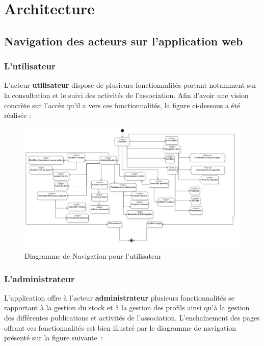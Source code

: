\documentclass[a4paper, titlepage]{report}
\let\oldparagraph\subsubsection
\renewcommand{\subsubsection}[1]{\oldparagraph{#1}\mbox{}}
\begin{document}
\section{Architecture}

\subsection{Navigation des acteurs sur l'application web}

\subsubsection{L'utilisateur}

L'acteur \textbf{utilisateur} dispose de plusieurs fonctionnalités portant
notamment sur la consultation et le suivi des activités de
l'association. Afin d'avoir une vision concrète sur l'accès qu'il a vers
ces fonctionnalités, la figure ci-dessous a été réalisée :

\clearpage
\begin{figure}[!h]
\centering
\includegraphics{Images/ArboUser.png}
\caption{Diagramme de Navigation pour l'utilisateur}
\end{figure}

\subsubsection{L'administrateur}

L'application offre à l'acteur \textbf{administrateur} plusieurs fonctionnalités
se rapportant à la gestion du stock et à la gestion des profils ainsi
qu'à la gestion des différentes publications et activités de
l'association. L'enchaînement des pages offrant ces fonctionnalités est
bien illustré par le diagramme de navigation présenté sur la figure
suivante~:
\end{document}
